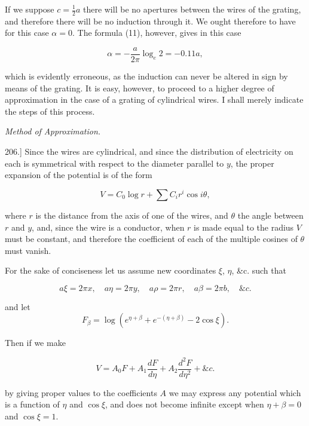 \documentclass[11pt,a4paper]{article}
\begin{document}
If we suppose $c=\frac{1}{2}a$ there will be no apertures between the
wires of the grating, and therefore there will be no induction through
it. We ought therefore to have for this case $\alpha=0$. The formula
(11), however, gives in this case

\[
\alpha=-\frac{a}{2\pi}\log_e 2=-0.11a,
\]

which is evidently erroneous, as the induction can never be altered in
sign by means of the grating. It is easy, however, to proceed to a higher
degree of approximation in the case of a grating of cylindrical wires. I
shall merely indicate the steps of this process.

\begin{center}
\textit{Method of Approximation.}
\end{center}

206.] Since the wires are cylindrical, and since the distribution of
electricity on each is symmetrical with respect to the diameter parallel
to $y$, the proper expansion of the potential is of the form

\begin{equation}\tag{14}
V=C_0\log r+\sum C_i r^i\cos i\theta,
\end{equation}

where $r$ is the distance from the axis of one of the wires, and
$\theta$ the angle between $r$ and $y$, and, since the wire is a
conductor, when $r$ is made equal to the radius $V$ must be constant,
and therefore the coefficient of each of the multiple cosines of
$\theta$ must vanish.

For the sake of conciseness let us assume new coordinates $\xi$, $\eta$,
\&c. such that

\begin{equation}\tag{15}
a\xi=2\pi x,\quad a\eta=2\pi y,\quad a\rho=2\pi r,\quad
a\beta=2\pi b,\quad \&c.
\end{equation}

and let 
\begin{equation}\tag{16}
F_\beta=\log\left(e^{\eta+\beta}+e^{-(\eta+\beta)}-2\cos\xi\right).
\end{equation}

Then if we make

\begin{equation}\tag{17}
V=A_0F+A_1\frac{dF}{d\eta}+A_2\frac{d^2F}{d\eta^2}+\&c.
\end{equation}

by giving proper values to the coefficients $A$ we may express any
potential which is a function of $\eta$ and $\cos\xi$, and does not
become infinite except when $\eta+\beta=0$ and $\cos\xi=1$.
\end{document}
